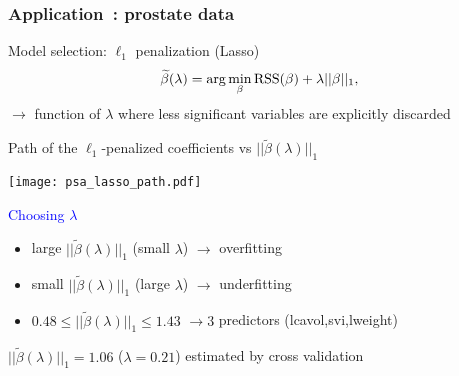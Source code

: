 \documentclass[compress, smaller, serif, 9pt]{beamer}
\begin{document}
\begin{frame}
  \frametitle{Application~: prostate data}
\begin{block}{Model selection: $\ell_1$ penalization (Lasso)}
\vspace{-3mm}
$$
\widetilde{\beta}(\lambda) = \arg \min_{\beta} \textrm{RSS}(\beta) + \lambda || \beta ||_{1},
\vspace{-2mm}
$$
$\rightarrow$ function of $\lambda$ where less significant variables are explicitly discarded
\end{block}
\vspace{-1mm}
\begin{block}{Path of the $\ell_1$-penalized coefficients vs
$|| \widetilde{\beta}(\lambda) ||_{1}$}
\begin{minipage}{.65\textwidth}
\begin{center}
\texttt{[image: psa\_lasso\_path.pdf]}
\end{center}
\end{minipage}
\begin{minipage}{.33\textwidth}
\small
\textcolor{blue}{Choosing $\lambda$}
\scriptsize
\begin{center}
\begin{itemize}
   \item large  $|| \widetilde{\beta}(\lambda) ||_{1}$  (small $\lambda$)  $\rightarrow$ overfitting
  \item small $|| \widetilde{\beta}(\lambda) ||_{1}$  (large $\lambda$) $\rightarrow$ underfitting
 \item $0.48 \le || \widetilde{\beta}(\lambda) ||_{1} \le 1.43$ $\rightarrow 3$
   predictors (lcavol,svi,lweight)
\end{itemize}
\medskip
$|| \widetilde{\beta}(\lambda) ||_{1}=1.06$ ($\lambda=0.21$) estimated by cross validation
\end{center}
\end{minipage}
\end{block}
\end{frame}
\end{document}
